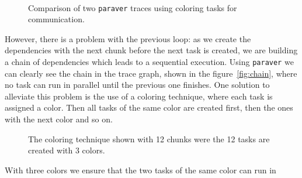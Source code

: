 \begin{figure}[h]%
	\centering
	\\
	\caption{Comparison of two \texttt{paraver} traces using coloring tasks for 
	communication.}
\end{figure}%
%
However, there is a problem with the previous loop: as we create the 
dependencies with the next chunk before the next task is created, we are 
building a chain of dependencies which leads to a sequential execution.  Using 
\texttt{paraver} we can clearly see the chain in the trace graph, shown in the 
figure~\ref{fig:chain}, where no task can run in parallel until the previous one 
finishes.  One solution to alleviate this problem is the use of a coloring 
technique, where each task is assigned a color.  Then all tasks of the same 
color are created first, then the ones with the next color and so on.
%
\begin{figure}[ht]%
\centering
{}
\caption{The coloring technique shown with 12 chunks were the 12 tasks are 
created with 3 colors.}
\label{fig:coloring}
\end{figure}%
%
With three colors we ensure that the two tasks of the same color can run in 
